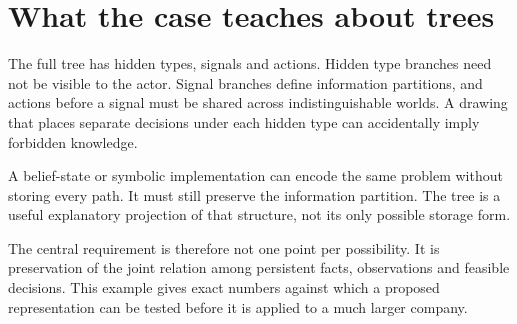 \section{What the case teaches about trees}
The full tree has hidden types, signals and actions. Hidden type branches need not be visible to the actor. Signal branches define information partitions, and actions before a signal must be shared across indistinguishable worlds. A drawing that places separate decisions under each hidden type can accidentally imply forbidden knowledge.

A belief-state or symbolic implementation can encode the same problem without storing every path. It must still preserve the information partition. The tree is a useful explanatory projection of that structure, not its only possible storage form.

The central requirement is therefore not one point per possibility. It is preservation of the joint relation among persistent facts, observations and feasible decisions. This example gives exact numbers against which a proposed representation can be tested before it is applied to a much larger company.
